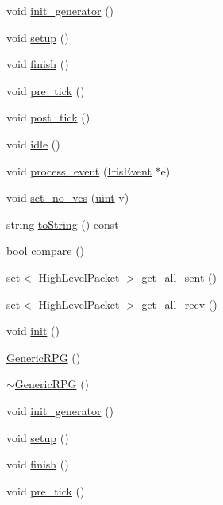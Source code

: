 \begin{CompactItemize}
\item 
void \hyperlink{classGenericRPG_addf993ae78d1b14589750c78d095aa4}{init\_\-generator} ()
\item 
void \hyperlink{classGenericRPG_e872cb83c70fbf7139fbf1b5cf14310f}{setup} ()
\item 
void \hyperlink{classGenericRPG_03ec120747d2935217291fe23f4c36dd}{finish} ()
\item 
void \hyperlink{classGenericRPG_f6fb1e75e66557481557760c1958612c}{pre\_\-tick} ()
\item 
void \hyperlink{classGenericRPG_f980f5bdb2b703f436b00bb8a318b2fb}{post\_\-tick} ()
\item 
void \hyperlink{classGenericRPG_661b35dacbf7bae62164df5fc1b73477}{idle} ()
\item 
void \hyperlink{classGenericRPG_72d08c87beeb16514c6c81af3296f6af}{process\_\-event} (\hyperlink{classIrisEvent}{IrisEvent} $\ast$e)
\item 
void \hyperlink{classGenericRPG_0f15df71a8cb244d55a2dce961b7a972}{set\_\-no\_\-vcs} (\hyperlink{outputBuffer_8h_91ad9478d81a7aaf2593e8d9c3d06a14}{uint} v)
\item 
string \hyperlink{classGenericRPG_a4303867728559ab6e6ae3d1390ede71}{toString} () const 
\item 
bool \hyperlink{classGenericRPG_4b7a50fa77416fc8b4f16948fb4da592}{compare} ()
\item 
set$<$ \hyperlink{classHighLevelPacket}{HighLevelPacket} $>$ \hyperlink{classGenericRPG_7f855d4d69dc3f019dffdf63d29e2bf4}{get\_\-all\_\-sent} ()
\item 
set$<$ \hyperlink{classHighLevelPacket}{HighLevelPacket} $>$ \hyperlink{classGenericRPG_e6ad83dd5abf9673db6f8bd713979392}{get\_\-all\_\-recv} ()
\item 
void \hyperlink{classGenericRPG_83b1fba5595a25b24b32374ec8e85020}{init} ()
\item 
\hyperlink{classGenericRPG_d909c0fb57cf1b74bacbb0798aa97b29}{GenericRPG} ()
\item 
\hyperlink{classGenericRPG_cff866cbb752b594437b5ddca59e0f03}{$\sim$GenericRPG} ()
\item 
void \hyperlink{classGenericRPG_addf993ae78d1b14589750c78d095aa4}{init\_\-generator} ()
\item 
void \hyperlink{classGenericRPG_e872cb83c70fbf7139fbf1b5cf14310f}{setup} ()
\item 
void \hyperlink{classGenericRPG_03ec120747d2935217291fe23f4c36dd}{finish} ()
\item 
void \hyperlink{classGenericRPG_f6fb1e75e66557481557760c1958612c}{pre\_\-tick} ()

\end{CompactItemize}
